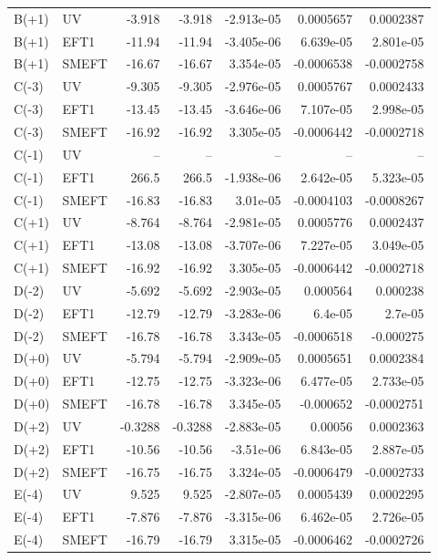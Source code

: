\begin{table}[htbp]
\begin{tabular}{llrrrrr}
B(+1) & UV & -3.918 & -3.918 & -2.913e-05 & 0.0005657 & 0.0002387 \\
B(+1) & EFT1 & -11.94 & -11.94 & -3.405e-06 & 6.639e-05 & 2.801e-05 \\
B(+1) & SMEFT & -16.67 & -16.67 & 3.354e-05 & -0.0006538 & -0.0002758 \\
C(-3) & UV & -9.305 & -9.305 & -2.976e-05 & 0.0005767 & 0.0002433 \\
C(-3) & EFT1 & -13.45 & -13.45 & -3.646e-06 & 7.107e-05 & 2.998e-05 \\
C(-3) & SMEFT & -16.92 & -16.92 & 3.305e-05 & -0.0006442 & -0.0002718 \\
C(-1) & UV & -- & -- & -- & -- & -- \\
C(-1) & EFT1 & 266.5 & 266.5 & -1.938e-06 & 2.642e-05 & 5.323e-05 \\
C(-1) & SMEFT & -16.83 & -16.83 & 3.01e-05 & -0.0004103 & -0.0008267 \\
C(+1) & UV & -8.764 & -8.764 & -2.981e-05 & 0.0005776 & 0.0002437 \\
C(+1) & EFT1 & -13.08 & -13.08 & -3.707e-06 & 7.227e-05 & 3.049e-05 \\
C(+1) & SMEFT & -16.92 & -16.92 & 3.305e-05 & -0.0006442 & -0.0002718 \\
D(-2) & UV & -5.692 & -5.692 & -2.903e-05 & 0.000564 & 0.000238 \\
D(-2) & EFT1 & -12.79 & -12.79 & -3.283e-06 & 6.4e-05 & 2.7e-05 \\
D(-2) & SMEFT & -16.78 & -16.78 & 3.343e-05 & -0.0006518 & -0.000275 \\
D(+0) & UV & -5.794 & -5.794 & -2.909e-05 & 0.0005651 & 0.0002384 \\
D(+0) & EFT1 & -12.75 & -12.75 & -3.323e-06 & 6.477e-05 & 2.733e-05 \\
D(+0) & SMEFT & -16.78 & -16.78 & 3.345e-05 & -0.000652 & -0.0002751 \\
D(+2) & UV & -0.3288 & -0.3288 & -2.883e-05 & 0.00056 & 0.0002363 \\
D(+2) & EFT1 & -10.56 & -10.56 & -3.51e-06 & 6.843e-05 & 2.887e-05 \\
D(+2) & SMEFT & -16.75 & -16.75 & 3.324e-05 & -0.0006479 & -0.0002733 \\
E(-4) & UV & 9.525 & 9.525 & -2.807e-05 & 0.0005439 & 0.0002295 \\
E(-4) & EFT1 & -7.876 & -7.876 & -3.315e-06 & 6.462e-05 & 2.726e-05 \\
E(-4) & SMEFT & -16.79 & -16.79 & 3.315e-05 & -0.0006462 & -0.0002726 \\

\end{tabular}
\end{table}
